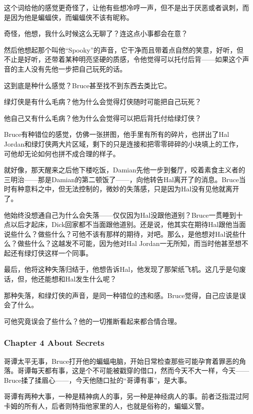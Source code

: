 \documentclass[../main.tex]{subfiles}
\begin{document}
这个词给他的感觉更奇怪了，让他有些想冷哼一声，但不是出于厌恶或者讽刺，而是因为他是蝙蝠侠，而蝙蝠侠不该有昵称。

奇怪，他想，我什么时候这么无聊了？连这点小事都会在意？

然后他想起那个叫他“Spooky”的声音，它干净而且带着点自然的笑意，好听，但不止是好听，还带着某种明亮坚硬的质感，令他觉得可以托付后背——如果这个声音的主人没有先他一步把自己玩死的话。

这到底是种什么感觉？Bruce甚至找不到东西去类比它。

绿灯侠是有什么毛病？他为什么会觉得灯侠随时可能把自己玩死？

他自己又有什么毛病？他为什么会觉得可以把后背托付给绿灯侠？

Bruce有种错位的感觉，仿佛一张拼图，他手里有所有的碎片，也拼出了Hal
Jordan和绿灯侠两大片区域，剩下的只是连接和把零零碎碎的小块填上的工作，可他却无论如何也拼不成合理的样子。

就好像，那天醒来之后他下楼吃饭，Damian先他一步到餐厅，咬着素食主义者的三明治——那是Damian的第二顿饭了——，向他转告Hal离开了的消息。Bruce当时有种意料之中，但无法控制的，微妙的失落感，只是因为Hal没有见他就离开了。

他始终没想通自己为什么会失落——仅仅因为Hal没跟他道别？Bruce一贯睡到十点以后才起床，Dick回家都不当面跟他道别。还是说，他其实在期待Hal跟他当面说些什么？做些什么？可他不该有那样的期待，对吧。那么，是他想对Hal说些什么？做些什么？这越发不可能，因为他对Hal
Jordan一无所知，而当时他甚至想不起还有绿灯侠这样一个同事。

最后，他将这种失落归结于，他想告诉Hal，他发现了那架纸飞机。这几乎是句废话，但，他还能想和Hal发生什么呢？

那种失落，和绿灯侠的声音，是同一种错位的违和感。Bruce觉得，自己应该是误会了什么。

可他究竟误会了些什么？他的一切推断看起来都合情合理。

\hypertarget{chapter-4-about-secrets}{%
  \subsubsection{Chapter 4 About Secrets}\label{chapter-4-about-secrets}}

哥谭太平无事，Bruce打开他的蝙蝠电脑，开始日常检查那些可能孕育着罪恶的角落。哥谭每天都有事，这是个不可能被戳穿的借口，然而今天不大一样，今天——Bruce揉了揉眉心——，今天他随口扯的“哥谭有事”，是大事。

哥谭有两种大事，一种是精神病人的事，另一种是神经病人的事。前者泛指混过阿卡姆的所有人，后者则特指他家里的人，也就是俗称的，蝙蝠义警。
\end{document}
